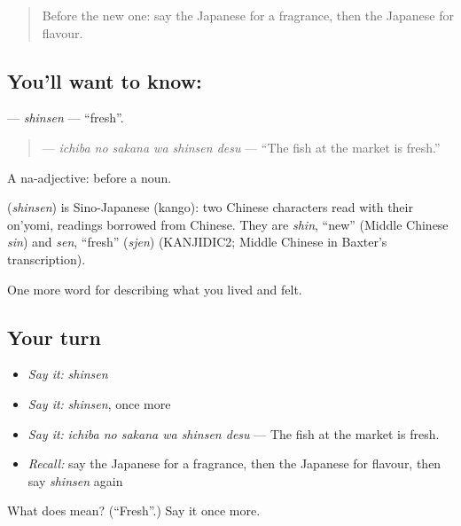 \begin{quote}
Before the new one: say the Japanese for a fragrance, then the Japanese for flavour.
\end{quote}

\subsection*{You'll want to know: }
\textbf{} — \emph{shinsen} — \textquotedblleft{}fresh\textquotedblright{}.

\begin{quote}
\textbf{  } — \emph{ichiba no sakana wa shinsen desu} — \textquotedblleft{}The fish at the market is fresh.\textquotedblright{}
\end{quote}

A na-adjective:  before a noun.

\begin{cousinweb}
\textbf{} (\emph{shinsen}) is Sino-Japanese (kango): two Chinese characters read with their on'yomi, readings borrowed from Chinese. They are \emph{shin}, \textquotedblleft{}new\textquotedblright{} (Middle Chinese \emph{sin}) and \emph{sen}, \textquotedblleft{}fresh\textquotedblright{} (\emph{sjen}) (KANJIDIC2; Middle Chinese in Baxter's transcription).
\end{cousinweb}

\begin{grammarlens}[title={What you've built}]
One more word for describing what you lived and felt.
\end{grammarlens}

\subsection*{Your turn}
\begin{itemize}
\raggedright
  \item \emph{Say it:} \emph{shinsen}
  \item \emph{Say it:} \emph{shinsen}, once more
  \item \emph{Say it:} \emph{ichiba no sakana wa shinsen desu} — The fish at the market is fresh.
  \item \emph{Recall:} say the Japanese for a fragrance, then the Japanese for flavour, then say \emph{shinsen} again
\end{itemize}

\begin{tcolorbox}[breakable,colback=teal!4,colframe=teal!35!black,title={Before you move on}]
What does  mean? (\textquotedblleft{}Fresh\textquotedblright{}.) Say it once more.
\end{tcolorbox}
